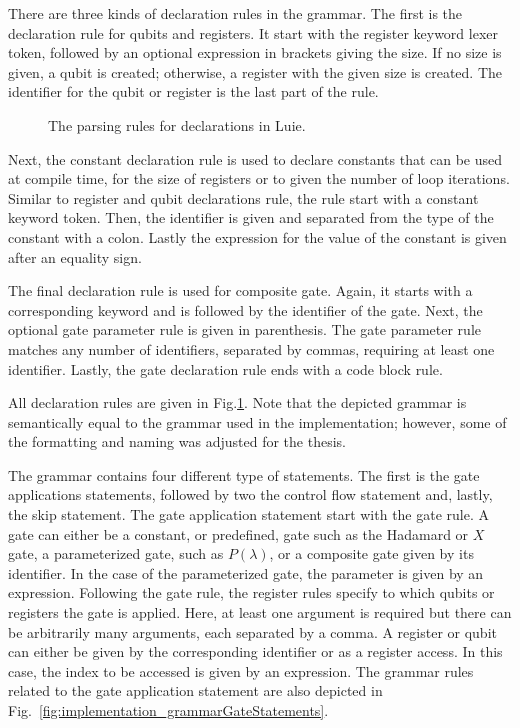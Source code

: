There are three kinds of declaration rules in the grammar. The first is the declaration rule for qubits and registers. It start with the register keyword lexer token, followed by an optional expression in brackets giving the size. If no size is given, a qubit is created; otherwise, a register with the given size is created. The identifier for the qubit or register is the last part of the rule. 

\begin{figure}[htp]
    \centering
    
    \caption{The parsing rules for declarations in Luie.}
    \label{fig:implementation_grammarDeclarations}
\end{figure}

Next, the constant declaration rule is used to declare constants that can be used at compile time, \eg for the size of registers or to given the number of loop iterations. Similar to register and qubit declarations rule, the rule start with a constant keyword token. Then, the identifier is given and separated from the type of the constant with a colon. Lastly the expression for the value of the constant is given after an equality sign.

The final declaration rule is used for composite gate. Again, it starts with a corresponding keyword and is followed by the identifier of the gate. Next, the optional gate parameter rule is given in parenthesis. The gate parameter rule matches any number of identifiers, separated by commas, requiring at least one identifier. Lastly, the gate declaration rule ends with a code block rule. 

All declaration rules are given in Fig.\ref{fig:implementation_grammarDeclarations}. Note that the depicted grammar is semantically equal to the grammar used in the implementation; however, some of the formatting and naming was adjusted for the thesis.

The grammar contains four different type of statements. The first is the gate applications statements, followed by two the control flow statement and, lastly, the skip statement. The gate application statement start with the gate rule. A gate can either be a constant, or predefined, gate such as the Hadamard or $X$ gate, a parameterized gate, such as $P(\lambda)$, or a composite gate given by its identifier. In the case of the parameterized gate, the parameter is given by an expression. Following the gate rule, the register rules specify to which qubits or registers the gate is applied. Here, at least one argument is required but there can be arbitrarily many arguments, each separated by a comma. A register or qubit can either be given by the corresponding identifier or as a register access. In this case, the index to be accessed is given by an expression. The grammar rules related to the gate application statement are also depicted in Fig.~\ref{fig:implementation_grammarGateStatements}. 

